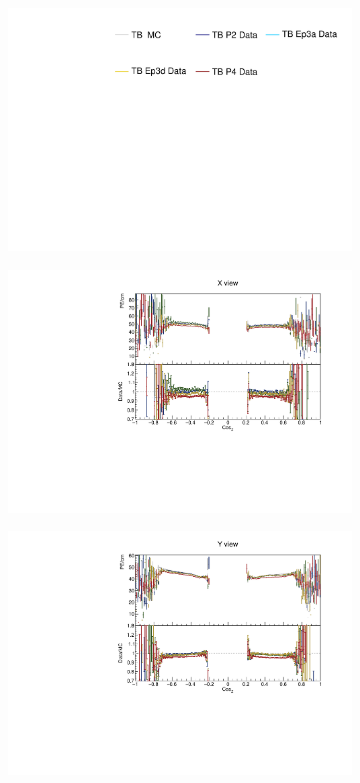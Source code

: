 \begin{figure}[!ht]
  \begin{subfigure}{\textwidth}
  \centering
    \includegraphics[height=0.2\linewidth]{essentialsec_tb/legend.pdf}
  \end{subfigure}
  \vspace*{2mm}
  
  \begin{subfigure}{0.5\textwidth}
    \includegraphics[width=\linewidth]{PlotsAngularDistribution/pecm_cosz_x.pdf}
  \end{subfigure}
  \begin{subfigure}{0.5\textwidth}
    \includegraphics[width=\linewidth]{PlotsAngularDistribution/pecm_cosz_y.pdf}

\end{subfigure}
\end{figure}
